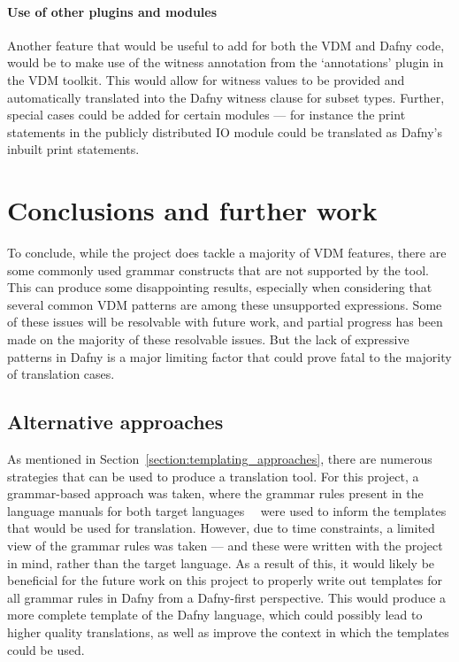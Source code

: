 \documentclass{entcs}
\begin{document}
\paragraph{Use of other plugins and modules}

Another feature that would be useful to add for both the VDM and Dafny code, would be to make use of the witness annotation from the `annotations' plugin in the VDM toolkit. This would allow for witness values to be provided and automatically translated into the Dafny witness clause for subset types. Further, special cases could be added for certain modules --- for instance the print statements in the publicly distributed IO module could be translated as Dafny's inbuilt print statements.

\section{Conclusions and further work}\label{section:conclusions}

To conclude, while the project does tackle a majority of VDM features, there are some commonly used grammar constructs that are not supported by the tool. This can produce some disappointing results, especially when considering that several common VDM patterns are among these unsupported expressions. Some of these issues will be resolvable with future work, and partial progress has been made on the majority of these resolvable issues. But the lack of expressive patterns in Dafny is a major limiting factor that could prove fatal to the majority of translation cases. 

\subsection{Alternative approaches}

As mentioned in Section~\ref{section:templating_approaches}, there are numerous strategies that can be used to produce a translation tool. For this project, a grammar-based approach was taken, where the grammar rules present in the language manuals for both target languages~\cite{DfyGrammar}~\cite{VDMLangMan} were used to inform the templates that would be used for translation. However, due to time constraints, a limited view of the grammar rules was taken --- and these were written with the project in mind, rather than the target language. As a result of this, it would likely be beneficial for the future work on this project to properly write out templates for all grammar rules in Dafny from a Dafny-first perspective. This would produce a more complete template of the Dafny language, which could possibly lead to higher quality translations, as well as improve the context in which the templates could be used.
\end{document}
